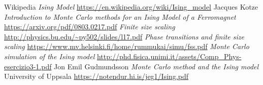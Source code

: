 \documentclass[a4paper, 11pt]{article}
\begin{document}
  \begin{thebibliography}{100}
     Wikipedia \emph{Ising Model} \url{https://en.wikipedia.org/wiki/Ising_model}
     Jacques Kotze \emph{Introduction to Monte Carlo methods for an Ising Model of a Ferromagnet} \url{https://arxiv.org/pdf/0803.0217.pdf}
     \emph{Finite size scaling} \url{http://physics.bu.edu/~py502/slides/l17.pdf}
     \emph{Phase transitions and finite size scaling} \url{https://www.mv.helsinki.fi/home/rummukai/simu/fss.pdf}
     \emph{Monte Carlo simulation of the Ising model} \url{http://phd.fisica.unimi.it/assets/Comp_Phys-esercizio3-1.pdf}
     Jon Emil Gudmundsson \emph{Monte Carlo method and the Ising model} University of Uppsala \url{https://notendur.hi.is/jeg1/Ising.pdf}

  \end{thebibliography}
\end{document}
